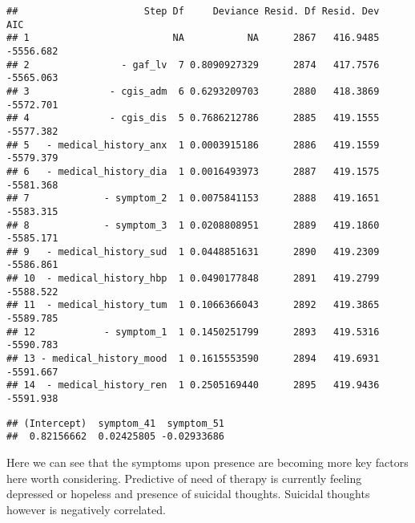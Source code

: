 \documentclass[
]{article}
\newenvironment{Shaded}{\begin{snugshade}}{\end{snugshade}}
\newcommand{\CommentTok}[1]{\textcolor[rgb]{0.56,0.35,0.01}{\textit{#1}}}
\newcommand{\FunctionTok}[1]{\textcolor[rgb]{0.13,0.29,0.53}{\textbf{#1}}}
\newcommand{\NormalTok}[1]{#1}
\newcommand{\OtherTok}[1]{\textcolor[rgb]{0.56,0.35,0.01}{#1}}
\newcommand{\SpecialCharTok}[1]{\textcolor[rgb]{0.81,0.36,0.00}{\textbf{#1}}}
\begin{document}
\begin{verbatim}
##                      Step Df     Deviance Resid. Df Resid. Dev       AIC
## 1                         NA           NA      2867   416.9485 -5556.682
## 2                - gaf_lv  7 0.8090927329      2874   417.7576 -5565.063
## 3              - cgis_adm  6 0.6293209703      2880   418.3869 -5572.701
## 4              - cgis_dis  5 0.7686212786      2885   419.1555 -5577.382
## 5   - medical_history_anx  1 0.0003915186      2886   419.1559 -5579.379
## 6   - medical_history_dia  1 0.0016493973      2887   419.1575 -5581.368
## 7             - symptom_2  1 0.0075841153      2888   419.1651 -5583.315
## 8             - symptom_3  1 0.0208808951      2889   419.1860 -5585.171
## 9   - medical_history_sud  1 0.0448851631      2890   419.2309 -5586.861
## 10  - medical_history_hbp  1 0.0490177848      2891   419.2799 -5588.522
## 11  - medical_history_tum  1 0.1066366043      2892   419.3865 -5589.785
## 12            - symptom_1  1 0.1450251799      2893   419.5316 -5590.783
## 13 - medical_history_mood  1 0.1615553590      2894   419.6931 -5591.667
## 14  - medical_history_ren  1 0.2505169440      2895   419.9436 -5591.938
\end{verbatim}

\begin{Shaded}
\end{Shaded}

\begin{verbatim}
## (Intercept)  symptom_41  symptom_51 
##  0.82156662  0.02425805 -0.02933686
\end{verbatim}

Here we can see that the symptoms upon presence are becoming more key
factors here worth considering. Predictive of need of therapy is
currently feeling depressed or hopeless and presence of suicidal
thoughts. Suicidal thoughts however is negatively correlated.

\begin{Shaded}
\end{Shaded}
\end{document}

